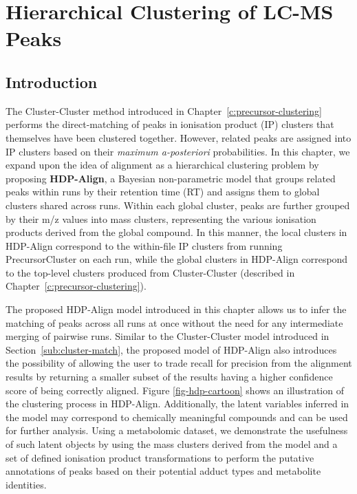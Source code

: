 \chapter{Hierarchical Clustering of LC-MS Peaks}
\label{c:hdp}

\section{Introduction}

The Cluster-Cluster method introduced in Chapter~\ref{c:precursor-clustering} performs the direct-matching of peaks in ionisation product (IP) clusters that themselves have been clustered together. However, related peaks are assigned into IP clusters based on their \textit{maximum a-posteriori} probabilities. In this chapter, we expand upon the idea of alignment as a hierarchical clustering problem by proposing \textbf{HDP-Align}, a Bayesian non-parametric model that groups related peaks within runs by their retention time (RT) and assigns them to global clusters shared across runs. Within each global cluster, peaks are further grouped by their m/z values into mass clusters, representing the various ionisation products derived from the global compound. In this manner, the local clusters in HDP-Align correspond to the within-file IP clusters from running PrecursorCluster on each run, while the global clusters in HDP-Align correspond to the top-level clusters produced from Cluster-Cluster (described in Chapter~\ref{c:precursor-clustering}). 

The proposed HDP-Align model introduced in this chapter allows us to infer the matching of peaks across all runs at once without the need for any intermediate merging of pairwise runs. Similar to the Cluster-Cluster model introduced in Section~\ref{sub:cluster-match}, the proposed model of HDP-Align also introduces the possibility of allowing the user to trade recall for precision from the alignment results by returning a smaller subset of the results having a higher confidence score of being correctly aligned. Figure \ref{fig-hdp-cartoon} shows an illustration of the clustering process in HDP-Align. Additionally, the latent variables inferred in the model may correspond to chemically meaningful compounds and can be used for further analysis. Using a metabolomic dataset, we demonstrate the usefulness of such latent objects by using the mass clusters derived from the model and a set of defined ionisation product transformations to perform the putative annotations of peaks based on their potential adduct types and metabolite identities.

